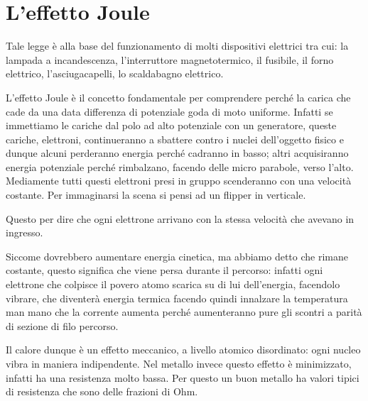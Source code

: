 
\newpage
\section{L'effetto Joule}
Tale legge è alla base del funzionamento di molti dispositivi elettrici tra cui: la lampada a incandescenza, l'interruttore magnetotermico, il fusibile, il forno elettrico, l'asciugacapelli, lo scaldabagno elettrico.

L'effetto Joule è il concetto fondamentale per comprendere perché la carica che cade da una data differenza di potenziale goda di moto uniforme.
Infatti se immettiamo le cariche dal polo ad alto potenziale con un generatore, queste cariche, elettroni, continueranno a sbattere contro i nuclei dell'oggetto fisico e dunque alcuni perderanno energia perché cadranno in basso; altri acquisiranno energia potenziale perché rimbalzano, facendo delle micro parabole,  verso l'alto. Mediamente tutti questi elettroni presi in gruppo scenderanno con una velocità costante. Per immaginarsi la scena si pensi ad un flipper in verticale.

Questo per dire che ogni elettrone arrivano con la stessa velocità che avevano in ingresso.

Siccome dovrebbero aumentare energia cinetica, ma abbiamo detto che rimane costante, questo significa che viene persa durante il percorso: infatti ogni elettrone che colpisce il povero atomo scarica su di lui dell'energia, facendolo vibrare, che diventerà energia termica facendo quindi innalzare la temperatura man mano che la corrente aumenta perché aumenteranno pure gli scontri a parità di sezione di filo percorso.

Il calore dunque è un effetto meccanico, a livello atomico disordinato: ogni nucleo vibra in maniera indipendente.
Nel metallo invece questo effetto è minimizzato, infatti ha una resistenza molto bassa. Per questo un buon metallo ha valori tipici di resistenza che sono delle frazioni di Ohm.

